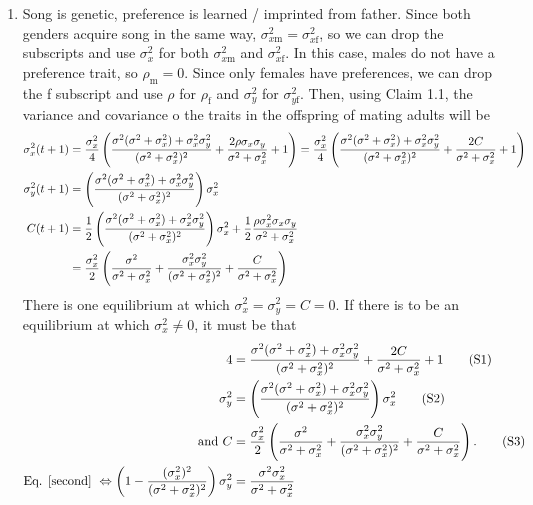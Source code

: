 \documentclass{article}
\newcommand{\x}[1]{\text{#1}}
\newcommand\numberthis{\addtocounter{equation}{1}\tag{\theequation}}
\begin{document}
\begin{enumerate}
\item Song is genetic, preference is learned / imprinted from father. Since both genders acquire song in the same way, $\sigma_{x\x{m}}^2=\sigma_{x\x{f}}^2$, so we can drop the 
subscripts and use $\sigma_x^2$ for both $\sigma_{x\x{m}}^2$ and $\sigma_{x\x{f}}^2$. In this case, males do not have a preference trait, so $\rho_\x{m}=0$. Since only females have preferences, we can drop the f subscript and use $\rho$ for $\rho_\x{f}$ and $\sigma_y^2$ for $\sigma_{y\x{f}}^2$. Then, using Claim 1.1, the variance and covariance o the traits in the offspring of mating adults will be 
\begin{align}
\sigma_x^2(t+1)&=\frac{\sigma_x^2}{4}\left(\frac{\sigma^2(\sigma^2+\sigma_x^2)+\sigma_x^2\sigma_y^2}{(\sigma^2+\sigma_x^2)^2}+\frac{2\rho\sigma_x\sigma_y}{\sigma^2+\sigma_x^2}+1\right)=\frac{\sigma_x^2}{4}\left(\frac{\sigma^2(\sigma^2+\sigma_x^2)+\sigma_x^2\sigma_y^2}{(\sigma^2+\sigma_x^2)^2}+\frac{2C }{\sigma^2+\sigma_x^2}+1\right) \label{sigmax8}
\\ \sigma_y^2(t+1)&=\left(\frac{\sigma^2(\sigma^2+\sigma_x^2)+\sigma_x^2\sigma_y^2}{(\sigma^2+\sigma_x^2)^2}\right)\sigma_x^2 \label{sigmay8}
\\ C(t+1)&=\frac{1}{2}\left(\frac{\sigma^2(\sigma^2+\sigma_x^2)+\sigma_x^2\sigma_y^2}{(\sigma^2+\sigma_x^2)^2}\right)\sigma_x^2+\frac{1}{2}\frac{\rho\sigma_x^2\sigma_x\sigma_y}{\sigma^2+\sigma_x^2} \notag
\\&=\frac{\sigma_x^2}{2}\left(\frac{\sigma^2}{\sigma^2+\sigma_x^2}+\frac{\sigma_x^2\sigma_y^2}{(\sigma^2+\sigma_x^2)^2}+\frac{C}{\sigma^2+\sigma_x^2}\right) \label{cov8}
\end{align}
There is one equilibrium at which $\sigma_x^2=\sigma_y^2=C=0$. If there is to be an equilibrium at which $\sigma_x^2\neq 0$, it must be that
\begin{align*}
4&=\frac{\sigma^2(\sigma^2+\sigma_x^2)+\sigma_x^2\sigma_y^2}{(\sigma^2+\sigma_x^2)^2}+\frac{2C }{\sigma^2+\sigma_x^2}+1 \numberthis \label{first} 
\\  \sigma_y^2&=\left(\frac{\sigma^2(\sigma^2+\sigma_x^2)+\sigma_x^2\sigma_y^2}{(\sigma^2+\sigma_x^2)^2}\right)\sigma_x^2 \numberthis \label{second}
\\ \text{ and } C&=\frac{\sigma_x^2}{2}\left(\frac{\sigma^2}{\sigma^2+\sigma_x^2}+\frac{\sigma_x^2\sigma_y^2}{(\sigma^2+\sigma_x^2)^2}+\frac{C}{\sigma^2+\sigma_x^2}\right).\numberthis  \label{third} 
\\ \text{Eq. \ref{second} } \Leftrightarrow \left(1-\frac{(\sigma_x^2)^2}{(\sigma^2+\sigma_x^2)^2}\right)\sigma_y^2&=\frac{\sigma^2\sigma_x^2}{\sigma^2+\sigma_x^2}

\end{align*}
\end{enumerate}
\end{document}
